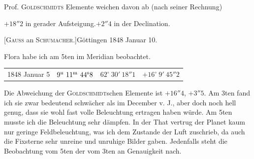 Prof. \textsc{Goldschmidts} Elemente weichen davon ab (nach seiner Rechnung)

\begin{center}
$+18''2$ in gerader Aufsteigung.\qquad $+2''4$ in der Declination.
\end{center}

\par{}\bigskip
\hypertarget{native-481-january10}{}
\begin{center}[\textsc{Gauss} an \textsc{Schumacher}.]\quad Göttingen 1848 Januar 10.\end{center}

Flora habe ich am 5ten im Meridian beobachtet.

\begin{center}
\setlength{\tabcolsep}{4pt}
\begin{tabular}{l|r|r|r}
1848 Januar 5 & $9^{\rm u}\ 11^{\rm m}\ 44^{\rm s}8$ & $62^\circ\ 30'\ 18''1$ & $+16^\circ\ 9'\ 45''2$ \\
\end{tabular}
\end{center}

Die Abweichung der \textsc{Goldschmidt}schen Elemente ist $+16''4$, $+3''5$. Am 3ten fand ich sie zwar bedeutend schwächer als im December v. J., aber doch noch hell genug, dass sie wohl fast volle Beleuchtung ertragen haben würde. Am 5ten musste ich die Beleuchtung sehr dämpfen. In der That vertrug der Planet kaum nur geringe Feldbeleuchtung, was ich dem Zustande der Luft zuschrieb, da auch die Fixsterne sehr unreine und unruhige Bilder gaben. Jedenfalls steht die Beobachtung vom 5ten der vom 3ten an Genauigkeit nach.
\clearpage
\endgroup
